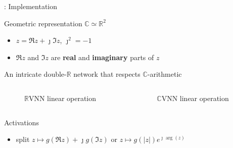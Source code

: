 \documentclass{beamer}
\newcommand{\real}{\mathbb{R}}
\newcommand{\cplx}{\mathbb{C}}
\newcommand{\iu}{{\jmath}}
\begin{document}
\begin{frame}[c]{\insertsection: Implementation}

  Geometric representation $\cplx \simeq \real^2$
  \begin{itemize}
    \item $z = \Re{z} + \iu \Im{z}$, $\iu^2 = -1$
    \item $\Re{z}$ and $\Im{z}$ are \textbf{real} and \textbf{imaginary} parts of $z$
  \end{itemize}

  \bigskip

  \bigskip
  An intricate double-$\real$ network that respects $\cplx$-arithmetic
  \vspace{-1em}
  \begin{columns}[T]
    \begin{column}{0.45\linewidth}
      \begin{figure}
          
        {$\real$VNN linear operation}
      \end{figure}
    \end{column}%
    \begin{column}{0.45\linewidth}
      \begin{figure}
          
        {$\cplx$VNN linear operation}
      \end{figure}
    \end{column}
  \end{columns}

  \bigskip

  \bigskip
  Activations
  \begin{itemize}
    \item split $
      z \mapsto g(\Re{z}) + \iu g(\Im{z}) %
    $ or $
      z \mapsto g(\lvert z\rvert) e^{\iu \arg{\!(z)}}
    $ %


\end{itemize}
\end{frame}
\end{document}
